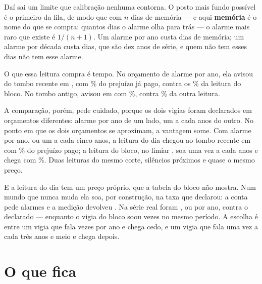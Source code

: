Daí sai um limite que calibração nenhuma contorna. O posto mais fundo possível é o primeiro da
fila, de modo que com $n$ dias de memória --- e aqui \textbf{memória} é o nome do que se compra:
quantos dias o alarme olha para trás --- o alarme mais raro que existe é $1/(n+1)$.
Um alarme
por ano custa \numMemoriaUmAlarmePorAnoDias{} dias de memória; um alarme por década custa
\numMemoriaUmAlarmePorDecadaDias{} dias, que são dez anos de série, e quem não tem esses dias
não tem esse alarme.

O que essa leitura compra é tempo. No orçamento de \numFundoUmAnoAlarmesPorAno{} alarme por
ano, ela avisou do tombo recente em \numSegundaLeituraTomboRecenteData, com
\numSegundaLeituraTomboRecentePagoPct\% do prejuízo já pago, contra os
\numVigiaTomboRecentePagoPct\% da leitura do bloco. No tombo antigo, avisou em
\numSegundaLeituraTomboAntigoData{} com \numSegundaLeituraTomboAntigoPagoPct\%, contra
\numVigiaTomboAntigoPagoPct\% da outra leitura.

A comparação, porém, pede cuidado, porque os dois vigias foram declarados em orçamentos
diferentes: \numFundoUmAnoAlarmesPorAno{} alarme por ano de um lado, um a cada
\numVigiaAnosParadoPorAlarme{} anos do outro. No ponto em que os dois orçamentos se aproximam,
a vantagem some. Com \numFundoCincoAnosAlarmesPorAno{} alarme por ano, ou um a cada cinco
anos, a leitura do dia chegou ao tombo recente em \numSegundaLeituraCincoAnosTomboRecenteData{}
com \numSegundaLeituraCincoAnosTomboRecentePagoPct\% do prejuízo pago; a leitura do bloco, no
limiar \numTrocaOitoLimiar, soa uma vez a cada \numTrocaOitoAnos{} anos e chega com
\numTrocaOitoPagoPct\%. Duas leituras do mesmo corte, silêncios próximos e quase o mesmo preço.

E a leitura do dia tem um preço próprio, que a tabela do bloco não mostra. Num mundo que nunca
muda ela soa, por construção, na taxa que declarou: a conta pede
\numSegundaLeituraParadoDeclarado{} alarmes e a medição devolveu \numSegundaLeituraParadoAlarmes{}\cite{ly2023tutorial}.
Na série real foram \numSegundaLeituraAlarmesReais{}, ou \numSegundaLeituraAlarmesAno{} por ano,
contra o \numFundoUmAnoAlarmesPorAno{} declarado --- enquanto o vigia do bloco soou
\numVigiaAlarmesReais{} vezes no mesmo período. A escolha é entre um vigia que fala \numSegundaLeituraAlarmesAno{}
vezes por ano e chega cedo, e um vigia que fala uma vez a cada três anos e meio e chega depois.

\section{O que fica}

